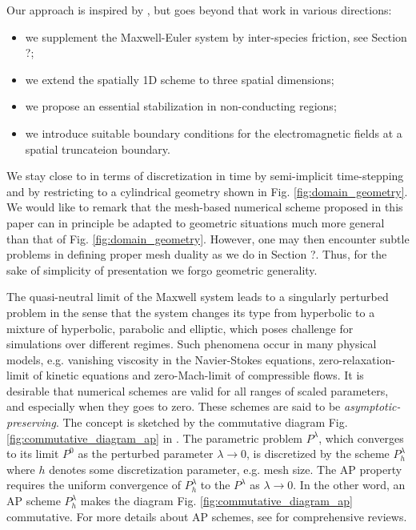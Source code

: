 \documentclass{article}
\begin{document}
Our approach is inspired by \cite{degond_2012}, but goes beyond that work in various directions:
\begin{itemize}
    \item we supplement the Maxwell-Euler system by inter-species friction, see Section ?;
    \item we extend the spatially 1D scheme to three spatial dimensions;
    \item we propose an essential stabilization in non-conducting regions;
    \item we introduce suitable boundary conditions for the electromagnetic fields at a spatial truncateion boundary.
\end{itemize}

We stay close to \cite{degond_2012} in terms of discretization in time by semi-implicit time-stepping and by restricting to a cylindrical geometry shown in Fig. \ref{fig:domain_geometry}. We would like to remark that the mesh-based numerical scheme proposed in this paper can in principle be adapted to geometric situations much more general than that of Fig. \ref{fig:domain_geometry}. However, one may then encounter subtle problems in defining proper mesh duality as we do in Section ?. Thus, for the sake of simplicity of presentation we forgo geometric generality.

The quasi-neutral limit of the Maxwell system leads to a singularly perturbed problem in the sense that the system changes its type from hyperbolic to a mixture of hyperbolic, parabolic and elliptic, which poses challenge for simulations over different regimes. Such phenomena occur in many physical models, e.g. vanishing viscosity in the Navier-Stokes equations\cite{Kato_1984}, zero-relaxation-limit of kinetic equations\cite{jin_2010} and zero-Mach-limit of compressible flows\cite{degond_2007, haack_2010}. It is desirable that numerical schemes are valid for all ranges of scaled parameters, and especially when they goes to zero. These schemes are said to be \emph{asymptotic-preserving}. The concept is sketched by the commutative diagram Fig. \ref{fig:commutative_diagram_ap} in \cite{jin_1999}. The parametric problem $P^\lambda$, which converges to its limit $P^0$ as the perturbed parameter $\lambda \rightarrow 0$, is discretized by the scheme $P^\lambda_h$ where $h$ denotes some discretization parameter, e.g. mesh size. The AP property requires the uniform convergence of $P^\lambda_h$ to the $P^\lambda$ as $\lambda\rightarrow0$. In the other word, an AP scheme $P^\lambda_h$ makes the diagram Fig. \ref{fig:commutative_diagram_ap} commutative. For more details about AP schemes, see \cite{jin_2010, degond_2017} for comprehensive reviews. 
\end{document}
